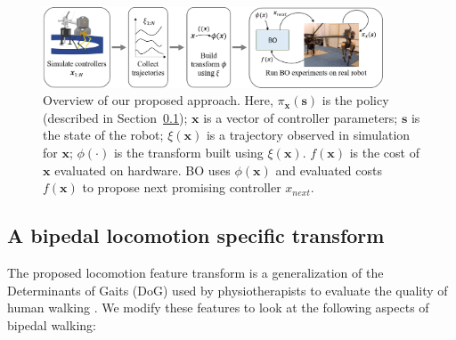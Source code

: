 \begin{figure}
    \centering
    \includegraphics[width=0.9\textwidth]{img/approach.png}
    \caption{Overview of our proposed approach. Here, $\pi_{\pmb{x}}(\pmb{s})$ is the policy (described in Section~\ref{});  $\pmb{x}$ is a vector of controller parameters; $\pmb{s}$ is the state of the robot; $\xi(\pmb{x})$ is a trajectory observed in simulation for $\pmb{x}$; $\phi(\cdot)$ is the transform built using $\xi(\pmb{x})$. $f(\pmb{x})$ is the cost of $\pmb{x}$ evaluated on hardware. BO uses $\phi(\pmb{x})$ and evaluated costs $f(\pmb{x})$ to propose next promising controller $x_{next}$. }
    \label{fig:approach}
\end{figure}

\subsection{A bipedal locomotion specific transform}
The proposed locomotion feature transform is a generalization of the Determinants of Gaits (DoG) used by physiotherapists to evaluate the quality of human walking \citep{inman1953major}. We modify these features to look at the following aspects of bipedal walking:

